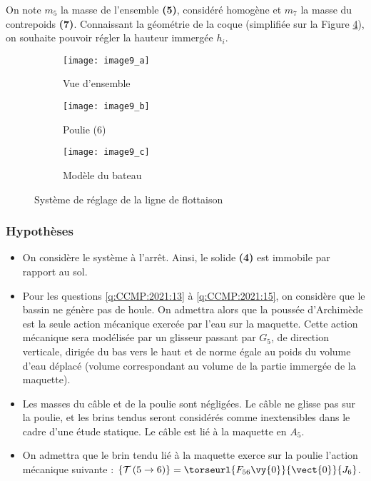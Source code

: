 On note $m_5$ la masse de l'ensemble \textbf{(5)}, considéré homogène et $m_7$ la masse du contrepoids \textbf{(7)}. Connaissant la géométrie de la coque (simplifiée sur la Figure \ref{fig:CCMP:2021:09}), on souhaite pouvoir régler la hauteur immergée $h_i$.

\begin{figure}[!h]
\centering
    \begin{subfigure}[b]{.3\textwidth}
    \centering
    \texttt{[image: image9\_a]}
    \caption{\label{fig:CCMP:2021:09:a}Vue d’ensemble }
    \end{subfigure}
    \begin{subfigure}[b]{.3\textwidth}
    \centering
    \texttt{[image: image9\_b]}
    \caption{\label{fig:CCMP:2021:09:b} Poulie (6)}
    \end{subfigure}
    \begin{subfigure}[b]{.3\textwidth}
    \centering
    \texttt{[image: image9\_c]}
    \caption{\label{fig:CCMP:2021:09:c} Modèle du bateau}
    \end{subfigure}
\caption{ \label{fig:CCMP:2021:09}Système de réglage de la ligne de flottaison}
\end{figure}

 
\subsubsection*{Hypothèses}
\begin{itemize}
\item On considère le système à l’arrêt. Ainsi, le solide \textbf{(4)} est immobile par rapport au sol.
\item Pour les questions \ref{q:CCMP:2021:13} à \ref{q:CCMP:2021:15}, on considère que le bassin ne génère pas de houle. On admettra alors que la poussée d’Archimède est la seule action mécanique exercée par l’eau sur la maquette. Cette action mécanique sera modélisée par un glisseur passant par $G_5$, de direction verticale, dirigée du bas vers le haut et de norme égale au poids du volume d’eau déplacé (volume correspondant au volume de la partie immergée de la maquette).
\item Les masses du câble et de la poulie sont négligées. Le câble ne glisse pas sur la poulie, et les brins tendus seront considérés comme inextensibles dans le cadre d’une étude statique. Le câble est lié à la maquette en $A_5$.
\item On admettra que le brin tendu lié à la maquette exerce sur la poulie l’action mécanique suivante :
$\left\{ \mathcal{T} \left(5\to 6 \right) \right\} = \torseurl{F_{56}\vy{0}}{\vect{0}}{J_6}$.
\end{itemize}


